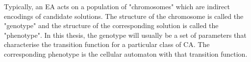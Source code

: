 Typically, an EA acts on a population of "chromosomes" which are indirect encodings of candidate solutions. The structure of the chromosome is called the "genotype" and the structure of the corresponding solution is called the "phenotype". In this thesis, the genotype will usually be a set of parameters that characterise the transition function for a particular class of CA. The corresponding phenotype is the cellular automaton with that transition function.\\

